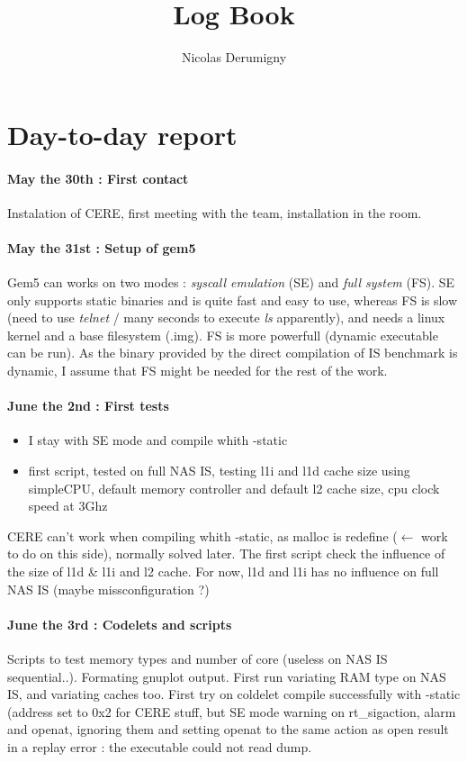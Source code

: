 \documentclass{article}
\title{Log Book}
\author{Nicolas Derumigny}
\begin{document}
\maketitle

\section*{Day-to-day report}

\paragraph*{May the 30th : First contact}
Instalation of CERE, first meeting with the team, installation in the room.

\paragraph*{May the 31st : Setup of gem5}
Gem5 can works on two modes : \textit{syscall emulation} (SE) and \textit{full system} (FS). SE only supports static binaries and is quite fast and easy to use, whereas FS is slow (need to use \textit{telnet} / many seconds to execute \textit{ls} apparently), and needs a linux kernel and a base filesystem (.img). FS is more powerfull (dynamic executable can be run). As the binary provided by the direct compilation of IS benchmark is dynamic, I assume that FS might be needed for the rest of the work. 

\paragraph*{June the 2nd : First tests}
\begin{itemize}
\item I stay with SE mode and compile whith -static
\item first script, tested on full NAS IS, testing l1i and l1d cache size using simpleCPU, default memory controller and default l2 cache size, cpu clock speed at 3Ghz
\end{itemize}
CERE can't work when compiling whith -static, as malloc is redefine ($\leftarrow$ work to do on this side), normally solved later.
The first script check the influence of the size of l1d \& l1i and l2 cache.
For now, l1d and l1i has no influence on full NAS IS (maybe missconfiguration ?)

\paragraph*{June the 3rd : Codelets and scripts}
Scripts to test memory types and number of core (useless on NAS IS sequential..). Formating gnuplot output. First run variating RAM type on NAS IS, and variating caches too. First try on coldelet compile successfully with -static (address set to 0x2 for CERE stuff, but SE mode warning on rt\_sigaction, alarm and openat, ignoring them and setting openat to the same action as open result in a replay error : the executable could not read dump.
\end{document}
